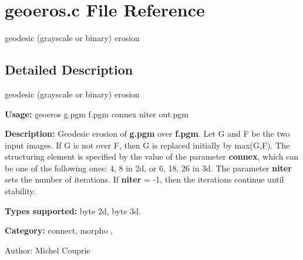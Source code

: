 \section{geoeros.c File Reference}
\label{geoeros_8c}
geodesic (grayscale or binary) erosion  




\label{_details}
\subsection{Detailed Description}
geodesic (grayscale or binary) erosion 

{\bf Usage:} geoeros g.pgm f.pgm connex niter out.pgm

{\bf Description:} Geodesic erosion of {\bf g.pgm} over {\bf f.pgm}. Let G and F be the two input images. If G is not over F, then G is replaced initially by max(G,F). The structuring element is specified by the value of the parameter {\bf connex}, which can be one of the following ones: 4, 8 in 2d, or 6, 18, 26 in 3d. The parameter {\bf niter} sets the number of iterations. If {\bf niter} = -1, then the iterations continue until stability.

{\bf Types supported:} byte 2d, byte 3d.

{\bf Category:} connect, morpho ,

\begin{Desc}
\item[Author:]Michel Couprie \end{Desc}
